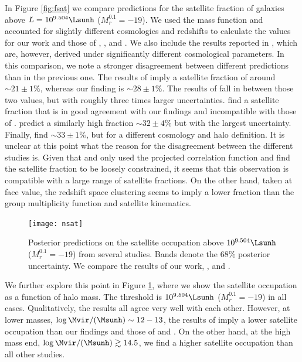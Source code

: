 \documentclass[fleqn,usenatbib,useAMS]{mnras}
\begin{document}
In Figure \ref{fig:fsat} we compare predictions for the satellite fraction of galaxies above $L = 10^{9.504} \Lsunh$ ($M_r^{0.1} = -19$). We used the \cite{Tinker+08} mass function and accounted for slightly different cosmologies and redshifts to calculate the values for our work and those of \cite{Guo+15b}, \cite{Zentner+16}, \cite{Vakili+16} and \cite{Sinha+17}. We also include the results reported in \cite{Zehavi+11}, which are, however, derived under significantly different cosmological parameters. In this comparison, we note a stronger disagreement between different predictions than in the previous one. The results of \cite{Guo+15b} imply a satellite fraction of around $\sim 21 \pm 1 \%$, whereas our finding is $\sim 28 \pm 1 \%$. The results of \cite{Vakili+16} fall in between those two values, but with roughly three times larger uncertainties. \cite{Sinha+17} find a satellite fraction that is in good agreement with our findings and incompatible with those of \cite{Guo+15b}. \cite{Zentner+16} predict a similarly high fraction $\sim 32 \pm 4 \%$ but with the largest uncertainty. Finally, \cite{Zehavi+11} find $\sim 33 \pm 1 \%$, but for a different cosmology and halo definition. It is unclear at this point what the reason for the disagreement between the different studies is. Given that \cite{Zentner+16} and \cite{Vakili+16} only used the projected correlation function and find the satellite fraction to be loosely constrained, it seems that this observation is compatible with a large range of satellite fractions. On the other hand, taken at face value, the redshift space clustering \cite{Guo+15b} seems to imply a lower fraction than the group multiplicity function \cite{Sinha+17} and satellite kinematics.

\begin{figure}
	\centering
	\texttt{[image: nsat]}
	\caption{Posterior predictions on the satellite occupation above $10^{9.504} \Lsunh$ ($M_r^{0.1} = -19$) from several studies. Bands denote the $68\%$ posterior uncertainty. We compare the results of our work, \protect\cite{Guo+15b}, \protect\cite{Vakili+16} and \protect\cite{Sinha+17}.}
	\label{fig:nsat}
\end{figure}

We further explore this point in Figure \ref{fig:nsat}, where we show the satellite occupation as a function of halo mass. The threshold is $10^{9.504} \Lsunh$ ($M_r^{0.1} = -19$) in all cases. Qualitatively, the results all agree very well with each other. However, at lower masses, $\log \Mvir / (\Msunh) \sim 12 - 13$, the results of \cite{Guo+15b} imply a lower satellite occupation than our findings and those of \cite{Zentner+16} and \cite{Sinha+17}. On the other hand, at the high mass end, $\log \Mvir / (\Msunh) \gtrsim 14.5$, we find a higher satellite occupation than all other studies.
\end{document}
